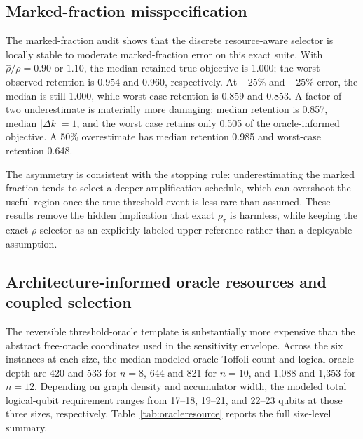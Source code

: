 \documentclass[5p,times]{elsarticle}
\begin{document}
\subsection{Marked-fraction misspecification}
The marked-fraction audit shows that the discrete resource-aware selector is locally stable to moderate marked-fraction error on this exact suite. With $\widehat{\rho}/\rho=0.90$ or $1.10$, the median retained true objective is 1.000; the worst observed retention is 0.954 and 0.960, respectively. At $-25\%$ and $+25\%$ error, the median is still 1.000, while worst-case retention is 0.859 and 0.853. A factor-of-two underestimate is materially more damaging: median retention is 0.857, median $|\Delta k|=1$, and the worst case retains only 0.505 of the oracle-informed objective. A 50\% overestimate has median retention 0.985 and worst-case retention 0.648.

The asymmetry is consistent with the stopping rule: underestimating the marked fraction tends to select a deeper amplification schedule, which can overshoot the useful region once the true threshold event is less rare than assumed. These results remove the hidden implication that exact $\rho_\tau$ is harmless, while keeping the exact-$\rho$ selector as an explicitly labeled upper-reference rather than a deployable assumption.

\subsection{Architecture-informed oracle resources and coupled selection}
The reversible threshold-oracle template is substantially more expensive than the abstract free-oracle coordinates used in the sensitivity envelope. Across the six instances at each size, the median modeled oracle Toffoli count and logical oracle depth are 420 and 533 for $n=8$, 644 and 821 for $n=10$, and 1,088 and 1,353 for $n=12$. Depending on graph density and accumulator width, the modeled total logical-qubit requirement ranges from 17--18, 19--21, and 22--23 qubits at those three sizes, respectively. Table~\ref{tab:oracleresource} reports the full size-level summary.

\begin{table}[t]
\centering
\caption{Architecture-informed reversible weighted-Max-Cut threshold-oracle resources. Counts follow the declared ripple-style logical template and are not post-transpilation metrics.}
\label{tab:oracleresource}

\end{table}
\end{document}
